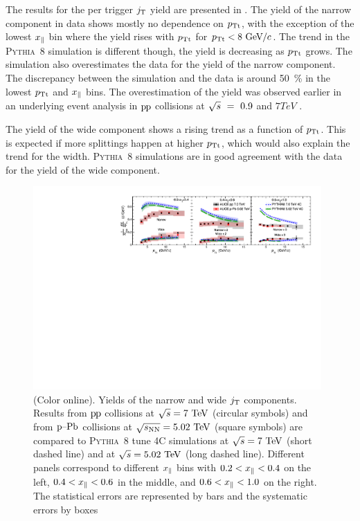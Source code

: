 The results for the per trigger $j_{\rm T}$ yield are presented in . The yield of the narrow component in data shows mostly no dependence on $p_{\rm Tt}$, with the exception of the lowest $x_{\parallel}$ bin where the yield rises with $p_{\rm Tt}$ for $p_{\rm Tt} < 8~\mathrm{GeV}\kern-0.05em/\kern-0.02em c$. The trend in the \textsc{Pythia}~8 simulation is different though, the yield is decreasing as $p_{\rm Tt}$ grows. The simulation also overestimates the data for the yield of the narrow component. The discrepancy between the simulation and the data is around 50~\% in the lowest $p_{\rm Tt}$ and $x_{\parallel}$ bins. The overestimation of the yield was observed earlier in an underlying event analysis in $\mbox{p\kern-0.05em p}$ collisions at $\sqrt{s}~=~0.9$ and $\unit{7}{TeV}$ \cite{ALICE:2011ac}.

The yield of the wide component shows a rising trend as a function of $p_{\rm Tt}$. This is expected if more splittings happen at higher $p_{\rm Tt}$, which would also explain the trend for the width. \textsc{Pythia}~8 simulations are in good agreement with the data for the yield of the wide component.
  
  \begin{figure}[t]
    \begin{center}
      \includegraphics[width = 0.98\textwidth]{figures/results/jt_yield_finalFormUniformTextSize}
    \end{center}
    \caption{(Color online). Yields of the narrow and wide $j_{\rm T}$ components. Results from $\mbox{p\kern-0.05em p}$ collisions at $\sqrt{s} = 7~\mathrm{TeV}$ (circular symbols) and from $\mbox{p--Pb}$ collisions at $\sqrt{s_{\mathrm{NN}}} = 5.02~\mathrm{TeV}$ (square symbols) are compared to \textsc{Pythia}~8 tune 4C simulations at $\sqrt{s} = 7~\mathrm{TeV}$ (short dashed line) and at $\sqrt{s} = 5.02~\mathrm{TeV}$ (long dashed line). Different panels correspond to different $x_{\parallel}$ bins with $0.2 < x_{\parallel} < 0.4$ on the left, $0.4 < x_{\parallel} < 0.6$ in the middle, and $0.6 < x_{\parallel} < 1.0$ on the right. The statistical errors are represented by bars and the systematic errors by boxes}
    \label{fig:jtyield}
  \end{figure}
  
